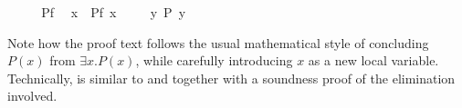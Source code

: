 \begin{isabellebody}
\isamarkupfalse%
\ {\isacharminus}\isanewline
\ \ \isamarkupfalse%
\ Pf\ \isamarkupfalse%
\ x\ \ {\isachardoublequote}P{\isacharparenleft}f\ x{\isacharparenright}{\isachardoublequote}\ \isamarkupfalse%
\isacommand{{\isachardot}{\isachardot}}\isanewline
\ \ \isamarkupfalse%
\ {\isachardoublequote}{\isasymexists}y{\isachardot}\ P\ y{\isachardoublequote}\ \isamarkupfalse%
\isacommand{{\isachardot}{\isachardot}}\isanewline
\isamarkupfalse%
\isamarkupfalse%
%
\begin{isamarkuptext}%
\noindent Note how the proof text follows the usual mathematical style
of concluding $P(x)$ from $\exists x. P(x)$, while carefully introducing $x$
as a new local variable.  Technically,  is similar to
 and  together with a soundness proof of
the elimination involved.


\end{isamarkuptext}
\end{isabellebody}
